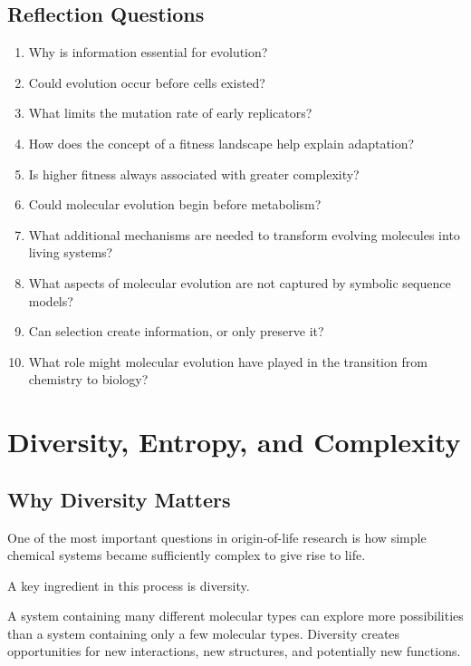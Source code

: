 \documentclass[
  oneside,
  openany]{book}
\providecommand{\tightlist}{%
  \setlength{\itemsep}{0pt}\setlength{\parskip}{0pt}}
\begin{document}
\section{Reflection Questions}\label{reflection-questions-2}

\begin{enumerate}
\def\labelenumi{\arabic{enumi}.}
\tightlist
\item
  Why is information essential for evolution?
\item
  Could evolution occur before cells existed?
\item
  What limits the mutation rate of early replicators?
\item
  How does the concept of a fitness landscape help explain adaptation?
\item
  Is higher fitness always associated with greater complexity?
\item
  Could molecular evolution begin before metabolism?
\item
  What additional mechanisms are needed to transform evolving molecules into living systems?
\item
  What aspects of molecular evolution are not captured by symbolic sequence models?
\item
  Can selection create information, or only preserve it?
\item
  What role might molecular evolution have played in the transition from chemistry to biology?
\end{enumerate}

\chapter{Diversity, Entropy, and Complexity}\label{diversity-entropy-and-complexity}

\section{Why Diversity Matters}\label{why-diversity-matters}

One of the most important questions in origin-of-life research is how simple chemical systems became sufficiently complex to give rise to life.

A key ingredient in this process is diversity.

A system containing many different molecular types can explore more possibilities than a system containing only a few molecular types. Diversity creates opportunities for new interactions, new structures, and potentially new functions.
\end{document}
